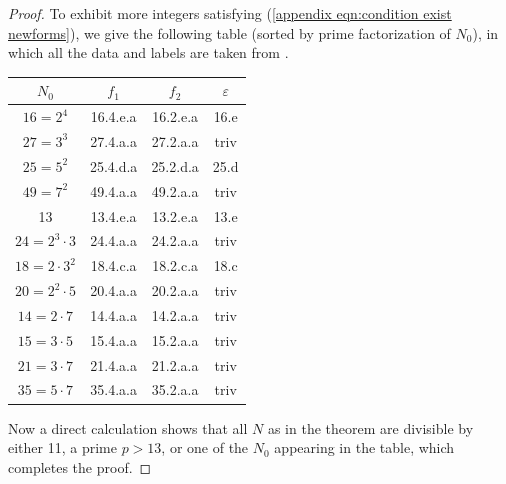 \documentclass[12pt]{amsart}
\theoremstyle{definition}
\begin{document}
\begin{proof}
To exhibit more integers satisfying (\ref{appendix eqn:condition exist newforms}), we give the following table (sorted by prime factorization of $N_0$), in which all the data and labels are taken from \cite{lmfdb}.
\begin{center}
\begin{tabular}{|c|c|c|c|} 
 \hline 
 $N_0$ & $f_1$ & $f_2$ & $\varepsilon$\\
 \hline
 \hline
 $16 = 2^4$ & 16.4.e.a & 16.2.e.a & 16.e \\
$ 27 = 3^3$ & 27.4.a.a & 27.2.a.a & triv\\
 $25 = 5^2$ & 25.4.d.a & 25.2.d.a & 25.d\\
 $49 = 7^2$ & 49.4.a.a & 49.2.a.a & triv\\
  13  & 13.4.e.a & 13.2.e.a & 13.e\\
 $24 = 2^3\cdot 3$ & 24.4.a.a & 24.2.a.a & triv \\
 $18 = 2\cdot 3^2$ & 18.4.c.a & 18.2.c.a  & 18.c\\
$20 = 2^2\cdot 5$ & 20.4.a.a & 20.2.a.a & triv\\
$ 14 = 2 \cdot 7$& 14.4.a.a & 14.2.a.a & triv \\
 $15 = 3\cdot 5$ & 15.4.a.a & 15.2.a.a & triv\\
 $21= 3\cdot 7$ & 21.4.a.a & 21.2.a.a & triv \\
  $35 = 5\cdot 7$& 35.4.a.a & 35.2.a.a & triv\\
 \hline
\end{tabular}
\end{center}
Now a direct calculation shows that all $N$ as in the theorem are divisible by either 11, a prime $p > 13$, or one of the $N_0$ appearing in the table, which completes the proof. 
\end{proof}
     

\end{document}
